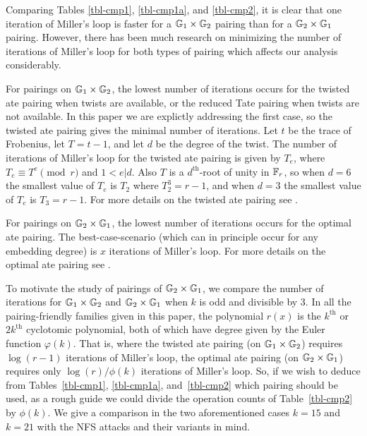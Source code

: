 Comparing Tables \ref{tbl-cmp1}, \ref{tbl-cmp1a}, and \ref{tbl-cmp2}, it is clear that one iteration of Miller's loop is faster for a $\mathbb{G}_{1} \times \mathbb{G}_{2}$ pairing than for a $\mathbb{G}_{2} \times \mathbb{G}_{1}$ pairing.
However, there has been much research on minimizing the number of iterations of Miller's loop for both types of pairing which affects our analysis considerably.

For pairings on $\mathbb{G}_{1} \times \mathbb{G}_{2}$, the lowest number of iterations occurs for the twisted ate pairing when twists are available, or the reduced Tate pairing when twists are not available.
In this paper we are explictly addressing the first case, so the twisted ate pairing gives the minimal number of iterations. 
Let $t$ be the trace of Frobenius, let $T = t-1$, and let $d$ be the degree of the twist. The number of iterations of Miller's loop for the twisted ate pairing is given by $T_e$, where
$T_e \equiv T^e \pmod{r}$ and $1 < e | d$. 
Also $T$ is a $d^{\text{th}}$-root of unity in $\mathbb{F}_{r}$, so when $d = 6$ the smallest value of
$T_e$ is $T_2$ where $T_2^3= r-1$, and when $d = 3$ the smallest value of $T_e$ is
$T_3 = r-1$. For more details on the twisted ate pairing see \cite{2006/hess}.

For pairings on $\mathbb{G}_{2} \times \mathbb{G}_{1}$, the lowest number of iterations occurs for the optimal ate pairing. The best-case-scenario (which can in principle occur for any embedding degree) is $x$ iterations of Miller's loop. For more details on the optimal ate pairing see \cite{2010/vercauteren}. 

To motivate the study of pairings of $\mathbb{G}_{2} \times \mathbb{G}_{1}$, 
we compare the number of iterations for $\mathbb{G}_{1} \times \mathbb{G}_{2}$ and $\mathbb{G}_{2} \times \mathbb{G}_{1}$ when $k$ is odd and divisible by 3. 
In all the pairing-friendly families given in this paper, the polynomial $r(x)$ is the $k^{\text{th}}$ or $2k^{\text{th}}$ cyclotomic polynomial, both of which have degree given by the Euler function $\varphi(k)$. 
That is, where the twisted ate pairing (on $\mathbb{G}_{1} \times \mathbb{G}_{2}$) requires $\log(r-1)$ iterations of Miller's loop,
the optimal ate pairing (on $\mathbb{G}_{2} \times \mathbb{G}_{1}$) requires only $\log(r)/\phi(k)$ iterations of Miller's loop. 
So, if we wish to deduce from Tables~\ref{tbl-cmp1}, \ref{tbl-cmp1a}, and~\ref{tbl-cmp2} which pairing should be used, as a rough guide we could divide the operation counts of Table~\ref{tbl-cmp2} by $\phi(k)$. We give a comparison in the two aforementioned cases $k=15$ and $k=21$ with the NFS attacks and their variants in mind.

